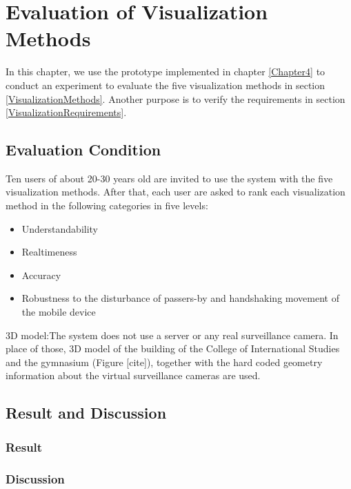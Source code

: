 \chapter{Evaluation of Visualization Methods}
\label{Chapter5}

In this chapter, we use the prototype implemented in chapter \ref{Chapter4} to conduct an experiment to evaluate the five visualization methods in section \ref{VisualizationMethods}. Another purpose is to verify the requirements in section \ref{VisualizationRequirements}.


\section{Evaluation Condition}

Ten users of about 20-30 years old are invited to use the system with the five visualization methods. After that, each user are asked to rank each visualization method in the following categories in five levels:

\begin{itemize}
	\item Understandability
	\item Realtimeness
	\item Accuracy
	\item Robustness to the disturbance of passers-by and handshaking movement of the mobile device
\end{itemize}

3D model:The system does not use a server or any real surveillance camera. In place of those, 3D model of the building of the College of International Studies and the gymnasium (Figure [cite]), together with the hard coded geometry information about the virtual surveillance cameras are used.


\section{Result and Discussion}

\subsection{Result}

\subsection{Discussion}

